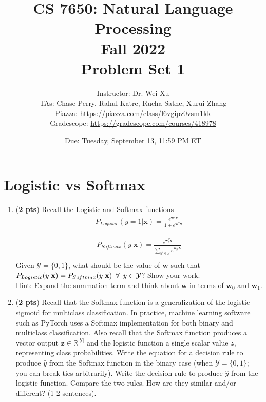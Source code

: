 \documentclass[11pt, letterpaper]{article}
\begin{document}
\title{CS 7650: Natural Language Processing \\ Fall 2022 \\ Problem Set 1}
\author{Instructor: Dr. Wei Xu \\ TAs: Chase Perry, Rahul Katre, Rucha Sathe, Xurui Zhang \\Piazza: \url{https://piazza.com/class/l6vgipz0vsm1kk}
\\Gradescope: \url{https://gradescope.com/courses/418978}}
\date{Due: Tuesday, September 13, 11:59 PM ET}
\maketitle

    \section{Logistic vs Softmax}

    \begin{enumerate}
        \item (\textbf{2 pts}) Recall the Logistic and Softmax functions
    \begin{align*}
        P_{Logistic}(y=1|\mathbf{x}) = \frac{e^{\mathbf{w}^T\mathbf{x}}}{1 + e^{\mathbf{w}^T\mathbf{x}}}
    \end{align*}
    
    \begin{align*}
        P_{Softmax}(y|\mathbf{x}) = \frac{e^{\mathbf{w}_y^T\mathbf{x}}}{\sum_{y' \in \mathcal{Y}} e^{\mathbf{w}_{y'}^T\mathbf{x}}} \\
    \end{align*}
    Given $\mathcal{Y} = \{0,1\}$, what should be the value of $\mathbf{w}$ such that \\ $P_{Logistic}(y|\textbf{x}) = P_{Softmax}(y|\textbf{x}) \hspace{0.5em} \forall \hspace{0.5em} y \in \mathcal{Y}$? Show your work. \\
    Hint: Expand the summation term and think about $\mathbf{w}$ in terms of $\mathbf{w}_0$ and $\mathbf{w}_1$.
    
    \item (\textbf{2 pts}) Recall that the Softmax function is a generalization of the logistic sigmoid for multiclass classification. In practice, machine learning software such as PyTorch uses a Softmax implementation for both binary and multiclass classification. Also recall that the Softmax function produces a vector output $\mathbf{z} \in \mathbb{R}^{|\mathcal{Y}|}$ and the logistic function a single scalar value $z$, representing class probabilities. Write the equation for a decision rule to produce $\hat{y}$ from the Softmax function in the binary case (when $\mathcal{Y} = \{0,1\}$; you can break ties arbitrarily).
    Write the decision rule to produce $\hat{y}$ from the logistic function. Compare the two rules. How are they similar and/or different? (1-2 sentences).
    \end{enumerate}
\end{document}
